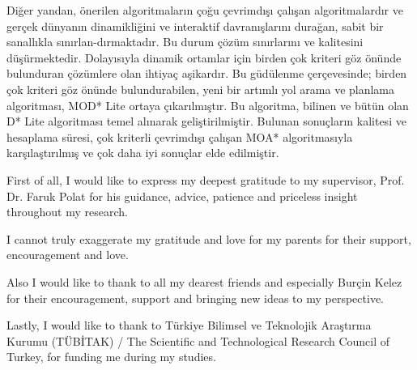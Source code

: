 \documentclass[11pt,oneandhalf,chaparabic]{metu}
\begin{document}
\begin{preliminaries}
\begin{oz}
Diğer yandan, önerilen algoritmaların çoğu çevrimdışı çalışan algoritmalardır ve gerçek dünyanın dinamikliğini ve interaktif davranışlarını durağan, sabit bir sanallıkla sınırlan-dırmaktadır. Bu durum çözüm sınırlarını ve kalitesini düşürmektedir. Dolayısıyla dinamik ortamlar için birden çok kriteri göz önünde bulunduran çözümlere olan ihtiyaç aşikardır. Bu güdülenme çerçevesinde; birden çok kriteri göz önünde bulundurabilen, yeni bir artımlı yol arama ve planlama algoritması, MOD* Lite ortaya çıkarılmıştır. Bu algoritma, bilinen ve bütün olan D* Lite algoritması temel alınarak geliştirilmiştir. Bulunan sonuçların kalitesi ve hesaplama süresi, çok kriterli çevrimdışı çalışan MOA* algoritmasıyla karşılaştırılmış ve çok daha iyi sonuçlar elde edilmiştir.
\end{oz} 

\dedication{\textit{To My Dearest Family}}

\setlength{\parindent}{0em}
\setlength{\parskip}{10pt}

\begin{acknowledgments} \oneandhalfspacing
First of all, I would like to express my deepest gratitude to my supervisor, Prof. Dr. Faruk Polat for his guidance, advice, patience and priceless insight throughout my research.

I cannot truly exaggerate my gratitude and love for my parents for their support, encouragement and love.

Also I would like to thank to all my dearest friends and especially Burçin Kelez for their encouragement, support and bringing new ideas to my perspective.

Lastly, I would like to thank to Türkiye Bilimsel ve Teknolojik Araştırma Kurumu (TÜBİTAK) / The Scientific and Technological Research Council of Turkey, for funding me during my studies.

\end{acknowledgments}
\setlength{\parindent}{0em}
\setlength{\parskip}{3pt}

\tableofcontents
\listoftables
\listoffigures
\end{preliminaries}
   
\setlength{\parindent}{0em}
\setlength{\parskip}{10pt}


\newpage


\newpage


\newpage


\newpage


\newpage

{}


%
\end{document}
